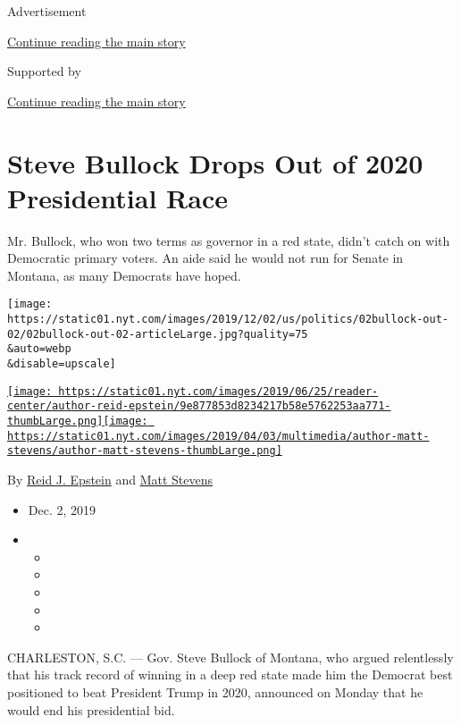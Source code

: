 Advertisement

\protect\hyperlink{after-top}{Continue reading the main story}

Supported by

\protect\hyperlink{after-sponsor}{Continue reading the main story}

\hypertarget{steve-bullock-drops-out-of-2020-presidential-race}{%
\section{Steve Bullock Drops Out of 2020 Presidential
Race}\label{steve-bullock-drops-out-of-2020-presidential-race}}

Mr. Bullock, who won two terms as governor in a red state, didn't catch
on with Democratic primary voters. An aide said he would not run for
Senate in Montana, as many Democrats have hoped.

\texttt{[image: https://static01.nyt.com/images/2019/12/02/us/politics/02bullock-out-02/02bullock-out-02-articleLarge.jpg?quality=75\\\&auto=webp\\\&disable=upscale]}

\href{https://www.nytimes.com/by/reid-j-epstein}{\texttt{[image: https://static01.nyt.com/images/2019/06/25/reader-center/author-reid-epstein/9e877853d8234217b58e5762253aa771-thumbLarge.png]}}\href{https://www.nytimes.com/by/matt-stevens}{\texttt{[image: https://static01.nyt.com/images/2019/04/03/multimedia/author-matt-stevens/author-matt-stevens-thumbLarge.png]}}

By \href{https://www.nytimes.com/by/reid-j-epstein}{Reid J. Epstein} and
\href{https://www.nytimes.com/by/matt-stevens}{Matt Stevens}

\begin{itemize}
\item
  Dec. 2, 2019
\item
  \begin{itemize}
  \item
  \item
  \item
  \item
  \item
  \end{itemize}
\end{itemize}

CHARLESTON, S.C. --- Gov. Steve Bullock of Montana, who argued
relentlessly that his track record of winning in a deep red state made
him the Democrat best positioned to beat President Trump in 2020,
announced on Monday that he would end his presidential bid.

